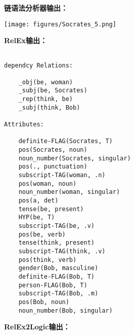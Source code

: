 {\bf 链语法分析器输出：}

\texttt{[image: figures/Socrates\_5.png]}

{\bf RelEx输出：}

\begin{verbatim}

dependcy Relations:

    _obj(be, woman)
    _subj(be, Socrates)
    _rep(think, be)
    _subj(think, Bob)

Attributes:

    definite-FLAG(Socrates, T)
    pos(Socrates, noun)
    noun_number(Socrates, singular)
    pos(., punctuation)
    subscript-TAG(woman, .n)
    pos(woman, noun)
    noun_number(woman, singular)
    pos(a, det)
    tense(be, present)
    HYP(be, T)
    subscript-TAG(be, .v)
    pos(be, verb)
    tense(think, present)
    subscript-TAG(think, .v)
    pos(think, verb)
    gender(Bob, masculine)
    definite-FLAG(Bob, T)
    person-FLAG(Bob, T)
    subscript-TAG(Bob, .m)
    pos(Bob, noun)
    noun_number(Bob, singular)

\end{verbatim}

{\bf RelEx2Logic输出：}

